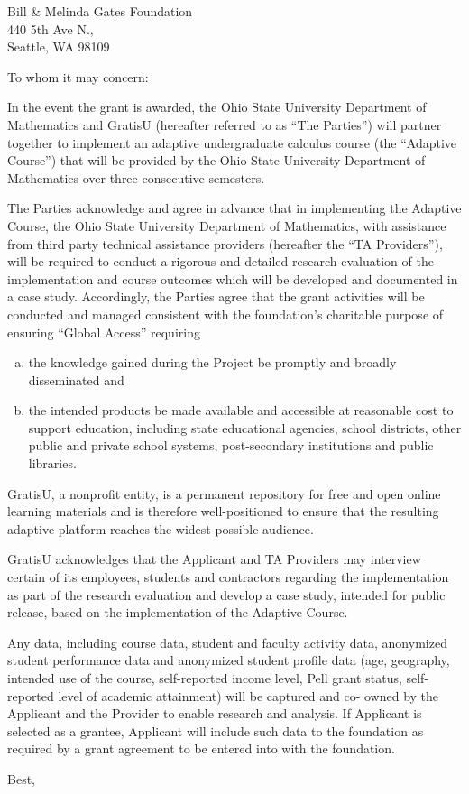 \documentclass[10pt]{gratisu-letter}
\begin{document}
\begin{letter}{Bill \& Melinda Gates Foundation \\ 440 5th Ave N., \\ Seattle, WA 98109}

\opening{To whom it may concern:}

In the event the grant is awarded, the Ohio State University
Department of Mathematics and GratisU (hereafter referred to as ``The
Parties'') will partner together to implement an adaptive
undergraduate calculus course (the ``Adaptive Course'') that will be
provided by the Ohio State University Department of Mathematics over
three consecutive semesters.
 
The Parties acknowledge and agree in advance that in implementing the
Adaptive Course, the Ohio State University Department of Mathematics,
with assistance from third party technical assistance providers
(hereafter the ``TA Providers''), will be required to conduct a
rigorous and detailed research evaluation of the implementation and
course outcomes which will be developed and documented in a case
study.  Accordingly, the Parties agree that the grant activities will
be conducted and managed consistent with the foundation's charitable
purpose of ensuring ``Global Access'' requiring
\begin{enumerate}[(a)]
\item the knowledge gained during the Project be promptly and broadly
  disseminated and
\item the intended products be made available and accessible at
  reasonable cost to support education, including state educational
  agencies, school districts, other public and private school systems,
  post-secondary institutions and public libraries.
\end{enumerate}
GratisU, a nonprofit entity, is a permanent repository for free and
open online learning materials and is therefore well-positioned to
ensure that the resulting adaptive platform reaches the widest
possible audience.

GratisU acknowledges that the Applicant and TA Providers may interview
certain of its employees, students and contractors regarding the
implementation as part of the research evaluation and develop a case
study, intended for public release, based on the implementation of the
Adaptive Course.
 
Any data, including course data, student and faculty activity data,
anonymized student performance data and anonymized student profile
data (age, geography, intended use of the course, self-reported income
level, Pell grant status, self-reported level of academic attainment)
will be captured and co- owned by the Applicant and the Provider to
enable research and analysis.  If Applicant is selected as a grantee,
Applicant will include such data to the foundation as required by a
grant agreement to be entered into with the foundation.
 
\closing{Best,}

\end{letter}
\end{document}
